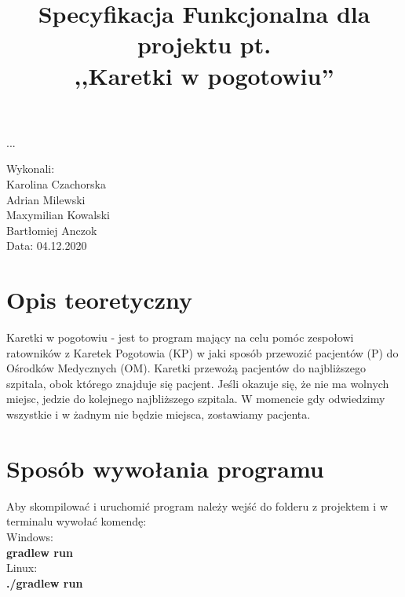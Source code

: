 \documentclass{article}
\title{Specyfikacja Funkcjonalna dla projektu pt. \\ ,,Karetki w pogotowiu''}
\author{}
\date{}
\begin{document}
\maketitle

\begin{flushright}
\par ...
\vfill
\par
Wykonali:
\\Karolina Czachorska
\\Adrian Milewski
\\Maxymilian Kowalski
\\Bartłomiej Anczok
\\Data: 04.12.2020
\end{flushright}

\thispagestyle{empty}
\newpage
\begin{frame}{}
    \tableofcontents
\end{frame}
\newpage
\section{Opis teoretyczny}
{\fontsize{14}{14}\selectfont
Karetki w pogotowiu - 
jest to program mający na celu pomóc zespołowi ratowników z Karetek Pogotowia (KP) w jaki sposób przewozić pacjentów (P) do Ośrodków Medycznych (OM). Karetki przewożą pacjentów do najbliższego szpitala, obok którego znajduje się pacjent.
Jeśli okazuje się, że nie ma wolnych miejsc, jedzie do kolejnego najbliższego szpitala. W momencie gdy odwiedzimy wszystkie i w żadnym nie będzie miejsca, zostawiamy pacjenta.
\newline}
\section{Sposób wywołania programu}
{\fontsize{14}{14}\selectfont 

Aby skompilować i uruchomić program należy wejść do folderu z projektem i w terminalu wywołać komendę:
\\Windows:\\
\textbf{gradlew run}
\newline
\\Linux:\\
\textbf{./gradlew run}
\newline
}
\end{document}
